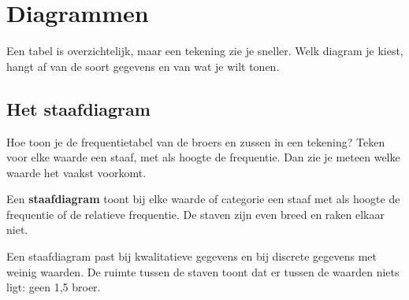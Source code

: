 \begin{oefeningen}
\end{oefeningen}

\section{Diagrammen}

Een tabel is overzichtelijk, maar een tekening zie je sneller. Welk diagram je kiest, hangt af van de soort gegevens en van wat je wilt tonen.

\subsection{Het staafdiagram}

Hoe toon je de frequentietabel van de broers en zussen in een tekening? Teken voor elke waarde een staaf, met als hoogte de frequentie. Dan zie je meteen welke waarde het vaakst voorkomt.

\begin{theorie}
Een \textbf{\textcolor{accent}{staafdiagram}} toont bij elke waarde of categorie een staaf met als hoogte de frequentie of de relatieve frequentie. De staven zijn even breed en raken elkaar niet.
\end{theorie}

Een staafdiagram past bij kwalitatieve gegevens en bij discrete gegevens met weinig waarden. De ruimte tussen de staven toont dat er tussen de waarden niets ligt: geen 1,5 broer.


